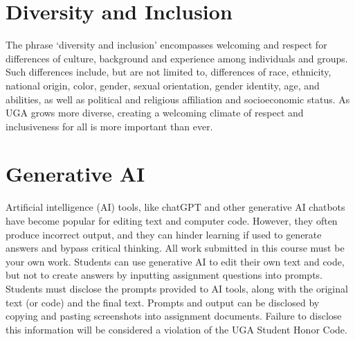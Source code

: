 \documentclass[12pt]{article}
\begin{document}
\vspace{-12pt}
\section*{\normalsize Diversity and Inclusion}
\vspace{-4mm}
The phrase ‘diversity and inclusion’ encompasses welcoming and respect
for differences of culture, background and experience among
individuals and groups. Such differences include, but are not limited
to, differences of race, ethnicity, national origin, color, gender,
sexual orientation, gender identity, age, and abilities, as well as
political and religious affiliation and socioeconomic status. As UGA
grows more diverse, creating a welcoming climate of respect and
inclusiveness for all is more important than ever. 

\vspace{-12pt}
\section*{\normalsize Generative AI}
\vspace{-4mm}


Artificial intelligence (AI) tools, like chatGPT and other generative AI
chatbots have become popular for editing text and computer code. However,
they often produce incorrect output, and they can hinder learning if
used to generate answers and bypass critical thinking. All work
submitted in this course must be your own work. 
Students can use generative AI to edit their own text and code,
but not to create answers by inputting assignment
questions into prompts. Students must disclose the prompts provided to 
AI tools, along with the original text (or code) and the final
text. Prompts and output can be disclosed by copying and pasting
screenshots into assignment documents. Failure to disclose this
information will be considered a violation of the UGA Student Honor
Code. 
\end{document}
